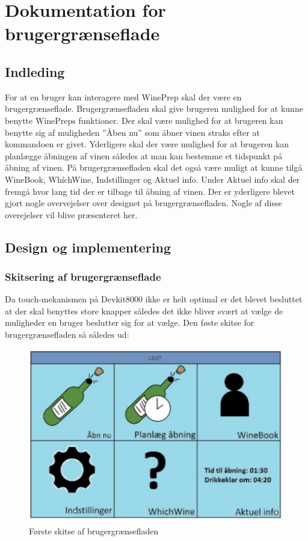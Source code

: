 \chapter{Dokumentation for brugergrænseflade}

\section{Indleding}

For at en bruger kan interagere med WinePrep skal der være en brugergrænseflade. Brugergrænsefladen skal give brugeren mulighed for at kunne benytte WinePreps funktioner. Der skal være mulighed for at brugeren kan benytte sig af muligheden ”Åben nu” som åbner vinen straks efter at kommandoen er givet. Yderligere skal der være mulighed for at brugeren kan planlægge åbningen af vinen således at man kan bestemme et tidspunkt på åbning af vinen. På brugergrænsefladen skal det også være muligt at kunne tilgå WineBook, WhíchWine, Indstillinger og Aktuel info. Under Aktuel info skal der fremgå hvor lang tid der er tilbage til åbning af vinen. Der er yderligere blevet gjort nogle overvejelser over designet på brugergrænsefladen. Nogle af disse overejelser vil blive præsenteret her.

\section{Design og implementering}
\subsection{Skitsering af brugergrænseflade}

Da touch-mekanismen på Devkit8000 ikke er helt optimal er det blevet besluttet at der skal benyttes store knapper således det ikke bliver svært at vælge de muligheder en bruger beslutter sig for at vælge. Den føste skitse for brugergrænsefladen så således ud:

\begin{figure}[H]
	\centering
\includegraphics{Billeder/skitse}
\caption{Første skitse af brugergrænsefladen}
\end{figure}

